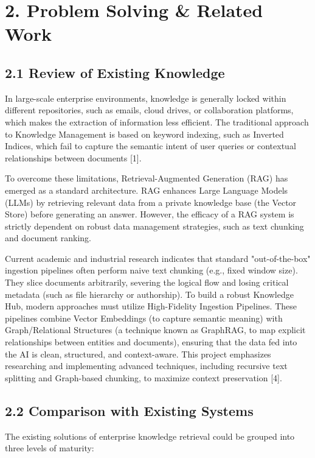 \documentclass[12pt]{article}
\begin{document}
\newpage
\section{2. Problem Solving \& Related Work}

\subsection{2.1 Review of Existing Knowledge}
In large-scale enterprise environments, knowledge is generally locked within different repositories, such as emails, cloud drives, or collaboration platforms, which makes the extraction of information less efficient. The traditional approach to Knowledge Management is based on keyword indexing, such as Inverted Indices, which fail to capture the semantic intent of user queries or contextual relationships between documents [1].

To overcome these limitations, Retrieval-Augmented Generation (RAG) has emerged as a standard architecture. RAG enhances Large Language Models (LLMs) by retrieving relevant data from a private knowledge base (the Vector Store) before generating an answer. However, the efficacy of a RAG system is strictly dependent on robust data management strategies, such as text chunking and document ranking.

Current academic and industrial research indicates that standard "out-of-the-box" ingestion pipelines often perform naive text chunking (e.g., fixed window size). They slice documents arbitrarily, severing the logical flow and losing critical metadata (such as file hierarchy or authorship). To build a robust Knowledge Hub, modern approaches must utilize High-Fidelity Ingestion Pipelines. These pipelines combine Vector Embeddings (to capture semantic meaning) with Graph/Relational Structures (a technique known as GraphRAG, to map explicit relationships between entities and documents), ensuring that the data fed into the AI is clean, structured, and context-aware. This project emphasizes researching and implementing advanced techniques, including recursive text splitting and Graph-based chunking, to maximize context preservation [4].

\subsection{2.2 Comparison with Existing Systems}
The existing solutions of enterprise knowledge retrieval could be grouped into three levels of maturity:
\end{document}
